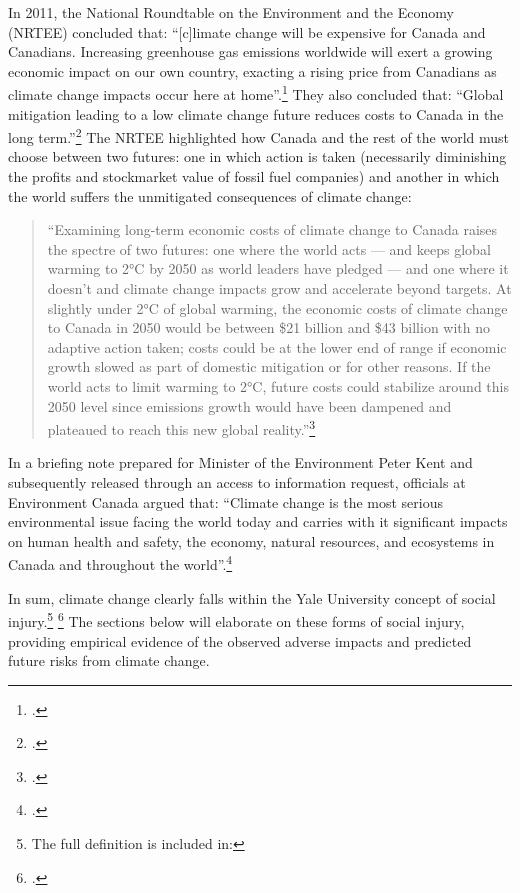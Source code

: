 In 2011, the National Roundtable on the Environment and the Economy (NRTEE) concluded that: ``[c]limate change will be expensive for Canada and Canadians. Increasing greenhouse gas emissions worldwide will exert a growing economic impact on our own country, exacting a rising price from Canadians as climate change impacts occur here at home''.\footcite[][p.15]{NRTEEPrice}
They also concluded that: ``Global mitigation leading to a low climate change future reduces costs to Canada in the long term.''\footcite[][p.16]{NRTEEPrice}
The NRTEE highlighted how Canada and the rest of the world must choose between two futures: one in which action is taken (necessarily diminishing the profits and stockmarket value of fossil fuel companies) and another in which the world suffers the unmitigated consequences of climate change:
\begin{quote}
``Examining long-term economic costs of climate change to Canada raises the spectre of two futures: one where the world acts — and keeps global warming to 2°C by 2050 as world leaders have pledged — and one where it doesn't and climate change impacts grow and accelerate beyond targets. At slightly under 2°C of global warming, the economic costs of climate change to Canada in 2050 would be between \$21 billion and \$43 billion with no adaptive action taken; costs could be at the lower end of range if economic growth slowed as part of domestic mitigation or for other reasons. If the world acts to limit warming to 2°C, future costs could stabilize around this 2050 level since emissions growth would have been dampened and plateaued to reach this new global reality.''\footcite[][p.18]{NRTEEPrice}
\end{quote}
In a briefing note prepared for Minister of the Environment Peter Kent and subsequently released through an access to information request, officials at Environment Canada argued that: ``Climate change is the most serious environmental issue facing the world today and carries with it significant impacts on human health and safety, the economy, natural resources, and ecosystems in Canada and throughout the world''.\footcite[][]{BureaucratsUrged}


In sum, climate change clearly falls within the Yale University concept of social injury.\footnote{The full definition is included in: } \footcite[See also: ][]{EthicalInvestor}
The sections below will elaborate on these forms of social injury, providing empirical evidence of the observed adverse impacts and predicted future risks from climate change.


